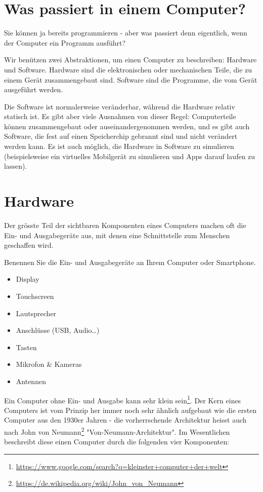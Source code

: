 \section{Was passiert in einem Computer?}

Sie können ja bereits programmieren - aber was passiert denn eigentlich, wenn der Computer ein Programm ausführt?

Wir benützen zwei Abstraktionen, um einen Computer zu beschreiben: Hardware und Software.
Hardware sind die elektronischen oder mechanischen Teile, die zu einem Gerät zusammengebaut sind. Software sind die Programme, die vom Gerät ausgeführt werden.

Die Software ist normalerweise veränderbar, während die Hardware relativ statisch ist. Es gibt aber viele Ausnahmen von dieser Regel: Computerteile können zusammengebaut oder auseinandergenommen werden, und es gibt auch Software, die fest auf einen Speicherchip gebrannt sind und nicht verändert werden kann. Es ist auch möglich, die Hardware in Software zu simulieren (beispielsweise ein virtuelles Mobilgerät zu simulieren und Apps darauf laufen zu lassen).

\section{Hardware}

Der grösste Teil der sichtbaren Komponenten eines Computers machen oft die Ein- und Ausgabegeräte aus, mit denen eine Schnittstelle zum Menschen geschaffen wird. 

\begin{question}
    Benennen Sie die Ein- und Ausgabegeräte an Ihrem Computer oder Smartphone.
\end{question}
\begin{solution}
    \begin{itemize}
        \item Display
        \item Touchscreen
        \item Lautsprecher
        \item Anschlüsse (USB, Audio…)
        \item Tasten
        \item Mikrofon \& Kameras
        \item Antennen
    \end{itemize}
\end{solution}

Ein Computer ohne Ein- und Ausgabe kann sehr klein sein\footnote{\url{https://www.google.com/search?q=kleinster+computer+der+welt}}.
Der Kern eines Computers ist vom Prinzip her immer noch sehr ähnlich aufgebaut wie die ersten Computer aus den 1930er Jahren
 - die vorherrschende Architektur heisst auch nach John von Neumann\footnote{\url{https://de.wikipedia.org/wiki/John_von_Neumann}}
"Von-Neumann-Architektur". Im Wesentlichen beschreibt diese einen Computer durch die folgenden vier Komponenten:

